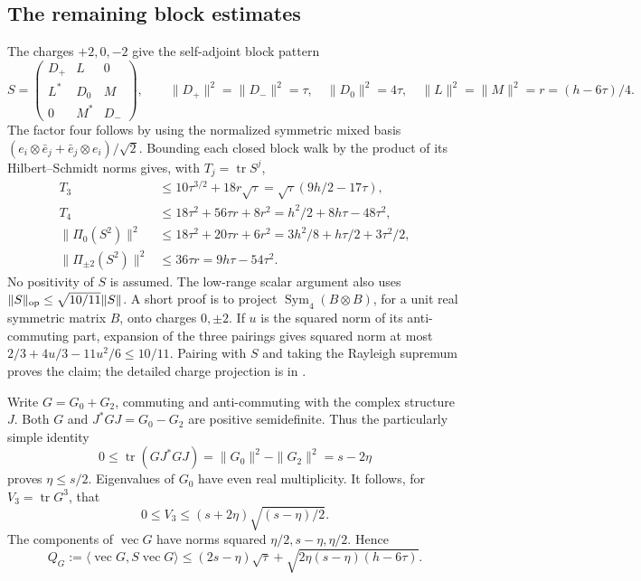 \subsection{The remaining block estimates}
The charges $+2,0,-2$ give the self-adjoint block pattern
\[
 S=\begin{pmatrix}D_+&L&0\\L^*&D_0&M\\0&M^*&D_-\end{pmatrix},\qquad
 \|D_+\|^2=\|D_-\|^2=\tau,\quad\|D_0\|^2=4\tau,
 \quad\|L\|^2=\|M\|^2=r=(h-6\tau)/4.
\]
The factor four follows by using the normalized symmetric mixed basis
$(e_i\otimes\bar e_j+\bar e_j\otimes e_i)/\sqrt2$.
Bounding each closed block walk by the product of its Hilbert--Schmidt
norms gives, with $T_j=\operatorname{tr}S^j$,
\[
\begin{split}
 T_3&\le10\tau^{3/2}+18r\sqrt\tau
          =\sqrt\tau(9h/2-17\tau),\\
 T_4&\le18\tau^2+56\tau r+8r^2
          =h^2/2+8h\tau-48\tau^2,\\
 \|\Pi_0(S^2)\|^2&\le18\tau^2+20\tau r+6r^2
          =3h^2/8+h\tau/2+3\tau^2/2,\\
 \|\Pi_{\pm2}(S^2)\|^2&\le36\tau r=9h\tau-54\tau^2.
\end{split}
\]
No positivity of $S$ is assumed. The low-range scalar argument also
uses $\|S\|_{\rm op}\le\sqrt{10/11}\|S\|$.
A short proof is to project $\operatorname{Sym}_4(B\otimes B)$, for
a unit real symmetric matrix $B$, onto charges $0,\pm2$. If $u$ is
the squared norm of its anti-commuting part, expansion of the three
pairings gives squared norm at most
$2/3+4u/3-11u^2/6\le10/11$.
Pairing with $S$ and taking the Rayleigh supremum proves the claim;
the detailed charge projection is in
.

Write $G=G_0+G_2$, commuting and anti-commuting with the complex
structure $J$. Both $G$ and $J^*GJ=G_0-G_2$ are positive semidefinite.
Thus the particularly simple identity
\[
 0\le\operatorname{tr}(GJ^*GJ)=\|G_0\|^2-\|G_2\|^2=s-2\eta
\]
proves $\eta\le s/2$. Eigenvalues of $G_0$ have even real
multiplicity. It follows, for $V_3=\operatorname{tr}G^3$, that
\[
 0\le V_3\le(s+2\eta)\sqrt{(s-\eta)/2}.
\]
The components of $\operatorname{vec}G$ have norms squared
$\eta/2,s-\eta,\eta/2$. Hence
\[
 Q_G:=\langle\operatorname{vec}G,S\operatorname{vec}G\rangle
 \le(2s-\eta)\sqrt\tau+
           \sqrt{2\eta(s-\eta)(h-6\tau)}.
\]

